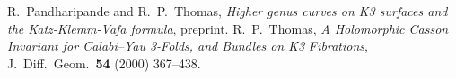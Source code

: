 \documentclass{amsart}
\theoremstyle{definition}
\begin{document}
\begin{thebibliography}{MNOP}
 R.~Pandharipande and R.~P.~Thomas, \textit{Higher genus curves on K3 surfaces and the Katz-Klemm-Vafa formula}, preprint.
 R.~P.~Thomas, \textit{A Holomorphic Casson Invariant for Calabi--Yau 3-Folds, and Bundles on K3 Fibrations}, J.~Diff.~Geom.~\textbf{54} (2000) 367--438.
\end{thebibliography}
\end{document}
